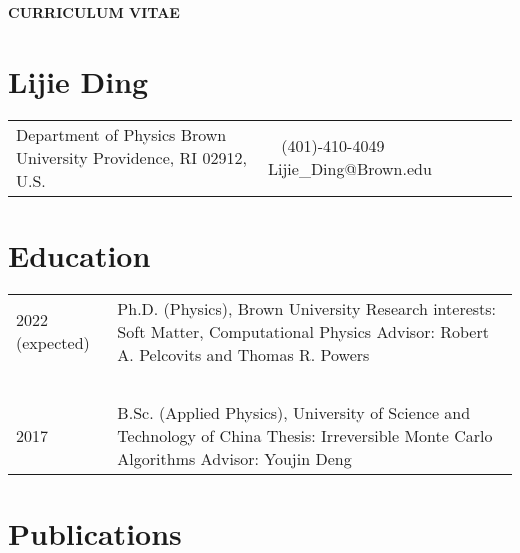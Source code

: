 \documentclass[11pt,letterpaper]{article}
\begin{document}
\pagestyle{headings}
\begin{center}
    \Large{\textbf{CURRICULUM VITAE}}
\end{center}
\section*{Lijie Ding}
\vspace*{-0.15in}
\begin{longtable}{p{0.5\linewidth} p{0.5\linewidth}}
    Department of Physics \newline
    Brown University \newline
    Providence, RI 02912, U.S.
     & ~\newline
    (401)-410-4049 \newline
    Lijie\_Ding@Brown.edu
\end{longtable}

\section*{Education}
\vspace*{-0.15in}
\begin{longtable}{l p{\linewidth}}
    2022 (expected) & Ph.D. (Physics), Brown University \newline
    Research interests: Soft Matter, Computational Physics \newline
    Advisor: Robert A. Pelcovits and Thomas R. Powers                                                 \\~\\
    2017            & B.Sc. (Applied Physics), University of Science and Technology of China \newline
    Thesis: Irreversible Monte Carlo Algorithms \newline
    Advisor: Youjin Deng
\end{longtable}

\section*{Publications}

%
\begin{etaremune}
    \item {}
    \item {}
    \item {}
    \item {}
\end{etaremune}
\end{document}
